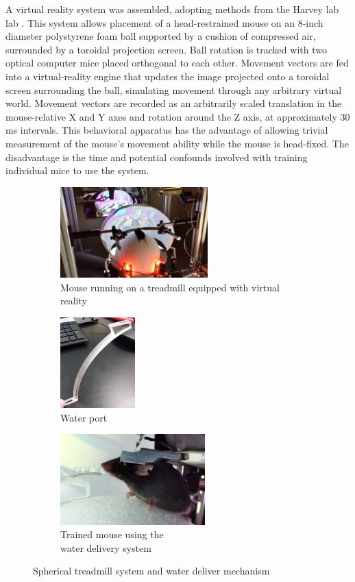A virtual reality system was assembled, adopting methods from the Harvey lab lab \cite{Harvey_2009}.
This system allows placement of a head-restrained mouse on an 8-inch diameter polystyrene foam ball supported by a cushion of compressed air, surrounded by a toroidal projection screen.
Ball rotation is tracked with two optical computer mice placed orthogonal to each other.
Movement vectors are fed into a virtual-reality engine that updates the image projected onto a toroidal screen surrounding the ball, simulating movement through any arbitrary virtual world.
Movement vectors are recorded as an arbitrarily scaled translation in the mouse-relative X and Y axes and rotation around the Z axis, at approximately 30 ms intervals.
This behavioral apparatus has the advantage of allowing trivial measurement of the mouse's movement ability while the mouse is head-fixed.
The disadvantage is the time and potential confounds involved with training individual mice to use the system.

\begin{figure}[htb]
	\begin{subfigure}[t]{0.32\linewidth}\centering
		\includegraphics[height=3.5cm]{figures/01-treadmill-mouse-running.jpg}
		\caption{Mouse running on a treadmill equipped with virtual reality}
	\end{subfigure}
	\hfill
	\begin{subfigure}[t]{0.159\linewidth}\centering
		\includegraphics[height=3.5cm]{figures/01-water-port.jpg}
		\caption{Water port}
	\end{subfigure}
	\begin{subfigure}[t]{0.45\linewidth}\centering
		\includegraphics[height=3.5cm]{figures/03-water-delivery-zoom.jpg}
		\caption{Trained mouse using the \\water delivery system}
	\end{subfigure}
	\caption{Spherical treadmill system and water deliver mechanism}
	\label{fig:spherical-treadmill-water-delivery}
\end{figure}

